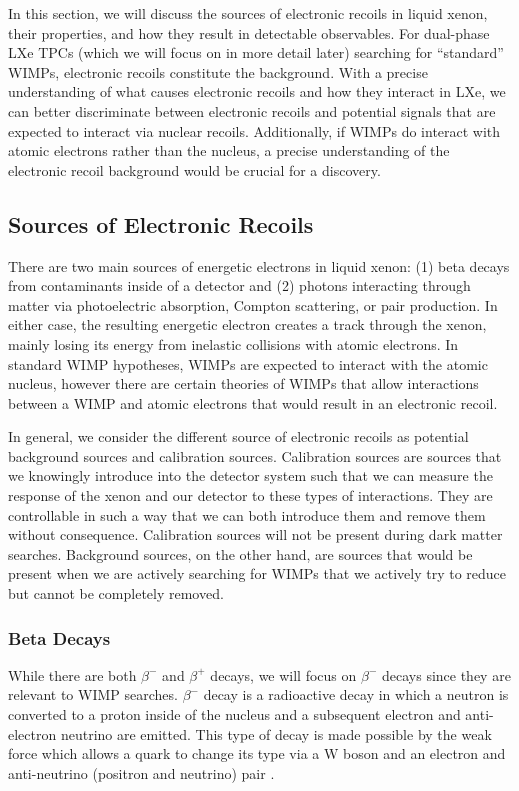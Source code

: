 In this section, we will discuss the sources of electronic recoils in liquid xenon, their properties, and how they result in detectable observables.  For dual-phase LXe TPCs (which we will focus on in more detail later) searching for ``standard'' WIMPs, electronic recoils constitute the background.  With a precise understanding of what causes electronic recoils and how they interact in LXe, we can better discriminate between electronic recoils and potential signals that are expected to interact via nuclear recoils.  Additionally, if WIMPs do interact with atomic electrons rather than the nucleus, a precise understanding of the electronic recoil background would be crucial for a discovery.  

\subsection{Sources of Electronic Recoils}

There are two main sources of energetic electrons in liquid xenon: (1) beta decays from contaminants inside of a detector and (2) photons interacting through matter via photoelectric absorption, Compton scattering, or pair production.  In either case, the resulting energetic electron creates a track through the xenon, mainly losing its energy from inelastic collisions with atomic electrons.   In standard WIMP hypotheses, WIMPs are expected to interact with the atomic nucleus, however there are certain theories of WIMPs that allow interactions between a WIMP and atomic electrons that would result in an electronic recoil. 

In general, we consider the different source of electronic recoils as potential background sources and calibration sources.  Calibration sources are sources that we knowingly introduce into the detector system such that we can measure the response of the xenon and our detector to these types of interactions.  They are controllable in such a way that we can both introduce them and remove them without consequence.  Calibration sources will not be present during dark matter searches.  Background sources, on the other hand, are sources that would be present when we are actively searching for WIMPs that we actively try to reduce but cannot be completely removed.

\subsubsection{Beta Decays}

While there are both $\beta^-$ and $\beta^+$ decays, we will focus on $\beta^-$ decays since they are relevant to WIMP searches.  $\beta^-$ decay is a radioactive decay in which a neutron is converted to a proton inside of the nucleus and a subsequent electron and anti-electron neutrino are emitted.  This type of decay is made possible by the weak force which allows a quark to change its type via a W boson and an electron and anti-neutrino (positron and neutrino) pair \cite{cottingham1987introduction}.

